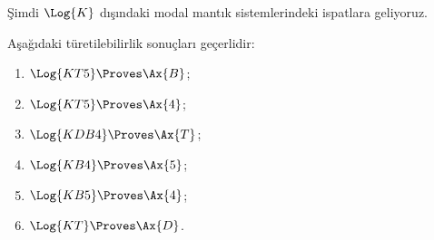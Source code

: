 



Şimdi $\Log{K}$ dışındaki modal mantık sistemlerindeki ispatlara geliyoruz.

\begin{prop}
Aşağıdaki türetilebilirlik sonuçları geçerlidir:
  \begin{enumerate}
  \item $\Log{KT5} \Proves \Ax{B}$;
  \item $\Log{KT5} \Proves \Ax{4}$;
  \item $\Log{KDB4} \Proves \Ax{T}$;
  \item $\Log{KB4} \Proves \Ax{5}$;
  \item $\Log{KB5} \Proves \Ax{4}$;
  \item {}$\Log{KT} \Proves \Ax{D}$.
  \end{enumerate}
\end{prop}

